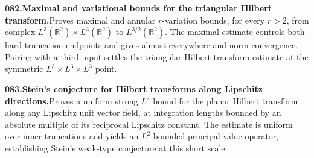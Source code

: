 \documentclass[11pt,a4paper]{article}
\begin{document}
  \par \begin{minipage}{\linewidth}
  \fontsize{10.5}{12.6}\selectfont\RaggedRight
  \hypertarget{result 082}{}
  {\bfseries\textcolor{muted}{082.}\enspace Maximal and variational bounds for the triangular Hilbert transform.}\enspace Proves maximal and annular $r$-variation bounds, for every $r>2$, from complex $L^3(\mathbb R^2)\times L^3(\mathbb R^2)$ to $L^{3/2}(\mathbb R^2)$. The maximal estimate controls both hard truncation endpoints and gives almost-everywhere and norm convergence. Pairing with a third input settles the triangular Hilbert transform estimate at the symmetric $L^3\times L^3\times L^3$ point.\par
  \end{minipage}\par\vspace{5pt}



  \par \begin{minipage}{\linewidth}
  \fontsize{10.5}{12.6}\selectfont\RaggedRight
  \hypertarget{result 083}{}
  {\bfseries\textcolor{muted}{083.}\enspace Stein's conjecture for Hilbert transforms along Lipschitz directions.}\enspace Proves a uniform strong $L^2$ bound for the planar Hilbert transform along any Lipschitz unit vector field, at integration lengths bounded by an absolute multiple of its reciprocal Lipschitz constant. The estimate is uniform over inner truncations and yields an $L^2$-bounded principal-value operator, establishing Stein's weak-type conjecture at this short scale.\par
  \end{minipage}\par\vspace{5pt}
\end{document}

